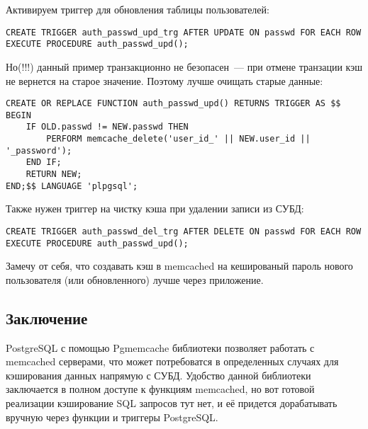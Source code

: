 Активируем триггер для обновления таблицы пользователей:
\begin{lstlisting}[label=lst:pgcache12,caption=Триггер]
CREATE TRIGGER auth_passwd_upd_trg AFTER UPDATE ON passwd FOR EACH ROW EXECUTE PROCEDURE auth_passwd_upd();
\end{lstlisting}

Но(!!!) данный пример транзакционно не безопасен~--- при отмене транзации кэш не вернется на старое значение. 
Поэтому лучше очищать старые данные:
\begin{lstlisting}[label=lst:pgcache13,caption=Очистка ключа в кэше]
CREATE OR REPLACE FUNCTION auth_passwd_upd() RETURNS TRIGGER AS $$
BEGIN
	IF OLD.passwd != NEW.passwd THEN
		PERFORM memcache_delete('user_id_' || NEW.user_id || '_password');
	END IF;
	RETURN NEW;
END;$$ LANGUAGE 'plpgsql';
\end{lstlisting}
 
Также нужен триггер на чистку кэша при удалении записи из СУБД:
\begin{lstlisting}[label=lst:pgcache14,caption=Триггер]
CREATE TRIGGER auth_passwd_del_trg AFTER DELETE ON passwd FOR EACH ROW EXECUTE PROCEDURE auth_passwd_upd();
\end{lstlisting}

Замечу от себя, что создавать кэш в memcached на кешированый пароль нового пользователя (или обновленного) лучше через приложение.

\subsection{Заключение}
PostgreSQL с помощью Pgmemcache библиотеки позволяет работать с memcached серверами, 
что может потребоватся в определенных случаях для кэширования данных напрямую с СУБД. 
Удобство данной библиотеки заключается в полном доступе к функциям memcached, 
но вот готовой реализации кэширование SQL запросов тут нет, 
и её придется дорабатывать вручную через функции и триггеры PostgreSQL.